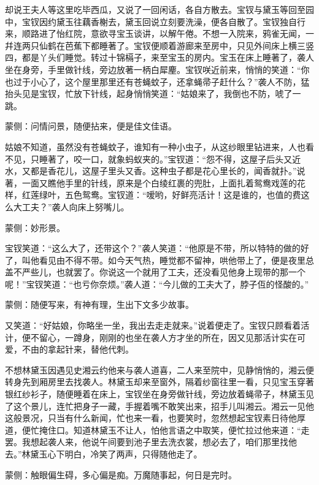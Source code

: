 \begin{parag}
    却说王夫人等这里吃毕西瓜，又说了一回闲话，各自方散去。宝钗与黛玉等回至园中，宝钗因约黛玉往藕香榭去，黛玉回说立刻要洗澡，便各自散了。宝钗独自行来，顺路进了怡红院，意欲寻宝玉谈讲，以解午倦。不想一入院来，鸦雀无闻，一幷连两只仙鹤在芭蕉下都睡著了。宝钗便顺着游廊来至房中，只见外间床上横三竖四，都是丫头们睡觉。转过十锦槅子，来至宝玉的房内。宝玉在床上睡著了，袭人坐在身旁，手里做针线，旁边放著一柄白犀麈。宝钗咲近前来，悄悄的笑道：“你也过于小心了，这个屋里那里还有苍蝇蚊子，还拿蝇帚子赶什么？”袭人不防，猛抬头见是宝钗，忙放下针线，起身悄悄笑道：“姑娘来了，我倒也不防，唬了一跳。\begin{note}蒙侧：问情问景，随便拈来，便是佳文佳语。\end{note}姑娘不知道，虽然没有苍蝇蚊子，谁知有一种小虫子，从这纱眼里钻进来，人也看不见，只睡著了，咬一口，就象蚂蚁夹的。”宝钗道：“怨不得，这屋子后头又近水，又都是香花儿，这屋子里头又香。这种虫子都是花心里长的，闻香就扑。”说著，一面又瞧他手里的针线，原来是个白绫红裹的兜肚，上面扎着鸳鸯戏莲的花样，红莲绿叶，五色鸳鸯。宝钗道：“嗳哟，好鲜亮活计！这是谁的，也值的费这么大工夫？”袭人向床上努嘴儿。\begin{note}蒙侧：妙形景。\end{note}宝钗笑道：“这么大了，还带这个？”袭人笑道：“他原是不带，所以特特的做的好了，叫他看见由不得不带。如今天气热，睡觉都不留神，哄他带上了，便是夜里总盖不严些儿，也就罢了。你说这一个就用了工夫，还没看见他身上现带的那一个呢！”宝钗笑道：“也亏你奈烦。”袭人道：“今儿做的工夫大了，脖子仾的怪酸的。”\begin{note}蒙侧：随便写来，有神有理，生出下文多少故事。\end{note}又笑道：“好姑娘，你略坐一坐，我出去走走就来。”说着便走了。宝钗只顾看着活计，便不留心，一蹲身，刚刚的也坐在袭人方才坐的所在，因又见那活计实在可爱，不由的拿起针来，替他代刺。
\end{parag}


\begin{parag}
    不想林黛玉因遇见史湘云约他来与袭人道喜，二人来至院中，见静悄悄的，湘云便转身先到厢房里去找袭人。林黛玉却来至窗外，隔着纱窗往里一看，只见宝玉穿著银红纱衫子，随便睡着在床上，宝钗坐在身旁做针线，旁边放着蝇帚子，林黛玉见了这个景儿，连忙把身子一藏，手握着嘴不敢笑出来，招手儿叫湘云。湘云一见他这般景况，只当有什么新闻，忙也来一看，也要笑时，忽然想起宝钗素日待他厚道，便忙掩住口。知道林黛玉不让人，怕他言语之中取笑，便忙拉过他来道：“走罢。我想起袭人来，他说午间要到池子里去洗衣裳，想必去了，咱们那里找他去。”林黛玉心下明白，冷笑了两声，只得随他走了。\begin{note}蒙侧：触眼偏生碍，多心偏是痴。万魔随事起，何日是完时。\end{note}
\end{parag}


